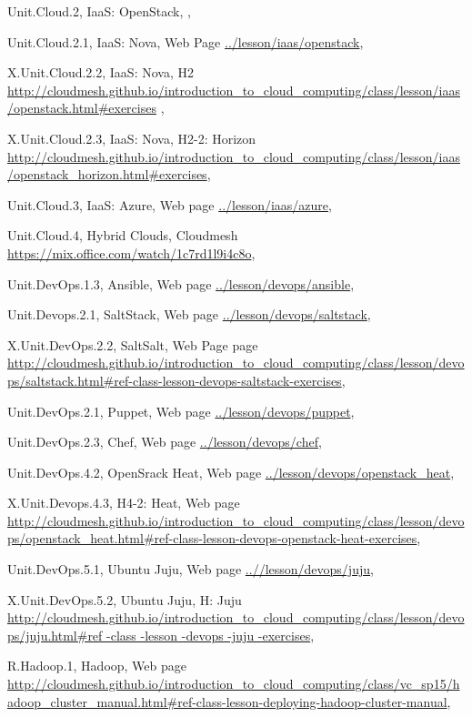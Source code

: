 Unit.Cloud.2, IaaS: OpenStack, ,

Unit.Cloud.2.1, IaaS: Nova, Web Page \url{../lesson/iaas/openstack},

X.Unit.Cloud.2.2, IaaS: Nova, H2 \url{http://cloudmesh.github.io/introduction_to_cloud_computing/class/lesson/iaas/openstack.html#exercises} ,

X.Unit.Cloud.2.3, IaaS: Nova, H2-2: Horizon \url{http://cloudmesh.github.io/introduction_to_cloud_computing/class/lesson/iaas/openstack_horizon.html#exercises},

Unit.Cloud.3, IaaS: Azure, Web page \url{../lesson/iaas/azure},  

Unit.Cloud.4, Hybrid Clouds, Cloudmesh \url{https://mix.office.com/watch/1c7rd1l9i4c8o},

Unit.DevOps.1.3, Ansible, Web page \url{../lesson/devops/ansible},

Unit.Devops.2.1, SaltStack, Web page \url{../lesson/devops/saltstack}, 

X.Unit.DevOps.2.2, SaltSalt, Web Page page \url{http://cloudmesh.github.io/introduction_to_cloud_computing/class/lesson/devops/saltstack.html#ref-class-lesson-devops-saltstack-exercises}, 

Unit.DevOps.2.1, Puppet, Web page \url{../lesson/devops/puppet}, 


Unit.DevOps.2.3, Chef, Web page \url{../lesson/devops/chef}, 


Unit.DevOps.4.2, OpenSrack Heat, Web page \url{../lesson/devops/openstack_heat}, 

X.Unit.Devops.4.3, H4-2: Heat, Web page \url{http://cloudmesh.github.io/introduction_to_cloud_computing/class/lesson/devops/openstack_heat.html#ref-class-lesson-devops-openstack-heat-exercises}, 

Unit.DevOps.5.1, Ubuntu Juju, Web page \url{..//lesson/devops/juju}, 

X.Unit.DevOps.5.2, Ubuntu Juju, H: Juju  \url{http://cloudmesh.github.io/introduction_to_cloud_computing/class/lesson/devops/juju.html#ref -class -lesson -devops -juju -exercises}, 

R.Hadoop.1, Hadoop, Web page \url{http://cloudmesh.github.io/introduction_to_cloud_computing/class/vc_sp15/hadoop_cluster_manual.html#ref-class-lesson-deploying-hadoop-cluster-manual}, 

